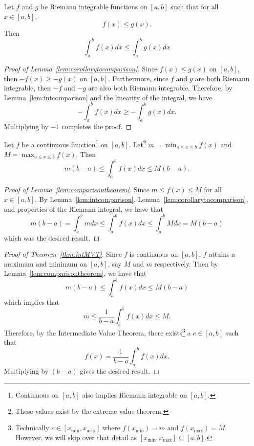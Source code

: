 \documentclass[12pt]{article}
\begin{document}
\begin{enumerate}[leftmargin=2em]
\begin{enumerate}[leftmargin=!]
        \begin{lemma}\label{lem:corollarytocomparison}
            Let $f$ and $g$ be Riemann integrable functions on $[a,b]$ such that for all $x\in [a,b]$,
            \[f(x)\leq g(x).\]
            Then
            \[\int_{a}^{b} f(x)dx\leq \int_{a}^{b} g(x)dx\]
        \end{lemma}
        \begin{proof}[Proof of Lemma~\ref{lem:corollarytocomparison}]
            Since $f(x)\leq g(x)$ on $[a,b]$, then $-f(x)\geq -g(x)$ on $[a,b]$. Furthermore, since $f$ and $g$ are both Riemann integrable, then $-f$ and $-g$ are also both Riemann integrable. Therefore, by Lemma~\ref{lem:intcomparison} and the linearity of the integral, we have
            \[-\int_{a}^{b}f(x)dx \geq -\int_{a}^{b}g(x)dx.\]
            Multiplying by $-1$ completes the proof.
        \end{proof}
        \newpage
        \begin{lemma}\label{lem:comparisontheorem}
            Let $f$ be a continuous function\footnote{Continuous on $[a,b]$ also implies Riemann integrable on $[a,b]$.} on $[a,b]$. Let\footnote{These values exist by the extreme value theorem.} $m=\min_{a\leq x\leq b} f(x)$ and $M=\max_{a\leq x\leq b}f(x)$. 
            Then
            \[m(b-a)\leq \int_{a}^{b} f(x)dx \leq M(b-a).\]
        \end{lemma}
        \begin{proof}[Proof of Lemma~\ref{lem:comparisontheorem}]
            Since $m\leq f(x)\leq M$ for all $x\in [a,b]$. By Lemma~\ref{lem:intcomparison}, Lemma~\ref{lem:corollarytocomparison}, and properties of the Riemann integral, we have that
            \[m(b-a)=\int_{a}^{b} m dx \leq  \int_{a}^{b} f(x) dx \leq \int_{a}^{b} M dx = M(b-a) \]
            which was the desired result.
        \end{proof}
        \begin{proof}[Proof of Theorem~\ref{thm:intMVT}]
            Since $f$ is continuous on $[a,b]$, $f$ attains a maximum and minimum on $[a,b]$, say $M$ and $m$ respectively. Then by Lemma~\ref{lem:comparisontheorem}, we have that
            \[m(b-a)\leq \int_{a}^{b} f(x) dx\leq M(b-a)\]
            which implies that
            \[m\leq \frac{1}{b-a} \int_{a}^{b} f(x) dx \leq M.\]
            Therefore, by the Intermediate Value Theorem, there exists\footnote{Technically $c\in [x_{\min},x_{\max}]$ where $f(x_{\min})=m$ and $f(x_{\max})= M$. However, we will skip over that detail as $[x_{\min},x_{\max}]\subseteq [a,b]$.} a $c\in [a,b]$ such that
            \[f(x)=\frac{1}{b-a}\int_{a}^{b}f(x)dx.\]
            Multiplying by $(b-a)$ gives the desired result.
        \end{proof}
    \end{enumerate}
    

\end{enumerate}
\end{document}
